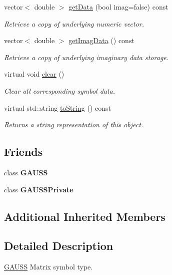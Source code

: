\begin{DoxyCompactItemize}
vector$<$ double $>$ \hyperlink{class_g_e_matrix_a7018ea49714fecb062fa29cc35ac52a2}{get\-Data} (bool imag=false) const 
\begin{DoxyCompactList}\small\item\em Retrieve a copy of underlying numeric vector. \end{DoxyCompactList}\item 
vector$<$ double $>$ \hyperlink{class_g_e_matrix_acdb28ea46f440a4b4f97e59b93d4950e}{get\-Imag\-Data} () const 
\begin{DoxyCompactList}\small\item\em Retrieve a copy of underlying imaginary data storage. \end{DoxyCompactList}\item 
virtual void \hyperlink{class_g_e_matrix_a1bf6ddd9f46248e1c03c0d952d572103}{clear} ()
\begin{DoxyCompactList}\small\item\em Clear all corresponding symbol data. \end{DoxyCompactList}\item 
virtual std\-::string \hyperlink{class_g_e_matrix_af17030b3ac740673ebe81612d9fe5963}{to\-String} () const 
\begin{DoxyCompactList}\small\item\em Returns a string representation of this object. \end{DoxyCompactList}\end{DoxyCompactItemize}
\subsection*{Friends}
\begin{DoxyCompactItemize}
\item 
\hypertarget{class_g_e_matrix_abc89e64d0ec6c939575c3125753c6309}{class {\bfseries G\-A\-U\-S\-S}}\label{class_g_e_matrix_abc89e64d0ec6c939575c3125753c6309}

\item 
\hypertarget{class_g_e_matrix_a2e5e14117f0e69078f45b8d512f056de}{class {\bfseries G\-A\-U\-S\-S\-Private}}\label{class_g_e_matrix_a2e5e14117f0e69078f45b8d512f056de}

\end{DoxyCompactItemize}
\subsection*{Additional Inherited Members}


\subsection{Detailed Description}
\hyperlink{class_g_a_u_s_s}{G\-A\-U\-S\-S} Matrix symbol type. 

